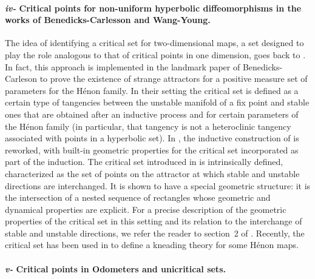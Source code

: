 \documentclass[a4paper,11pt]{article}
\theoremstyle{definition}
\begin{document}
\paragraph{{\em iv-} Critical points for non-uniform hyperbolic diffeomorphisms  in the  works of Benedicks-Carlesson and Wang-Young.}

The idea of identifying a critical set for two-dimensional maps, a set designed to play the role analogous to that of critical points in one dimension, goes back to \cite{BC}. In fact, this approach is implemented in the landmark paper of Benedicks-Carleson \cite{BC} to prove the existence of strange attractors for a positive measure set of parameters for the H\'enon family. In their setting the critical set is defined as a certain type of tangencies between the unstable manifold of a fix point and stable ones that are obtained after an inductive process and for certain parameters of the  H\'enon family (in particular, that tangency is  not a heteroclinic tangency associated with points in a hyperbolic set).
In \cite{WY}, the inductive construction of \cite{BC} is reworked, with built-in geometric properties for the critical set incorporated as part of the induction. 
The critical set introduced in \cite{WY} is intrinsically defined, characterized as the set of points on the attractor at which stable and unstable directions are interchanged. It is shown to have a special geometric structure: it is the intersection of a nested sequence of rectangles whose geometric and dynamical properties are explicit. For a precise description of the geometric properties of the critical set in 
this setting and its relation to the interchange of stable and unstable 
directions, we refer the reader to section~2 of \cite{WY}. 
Recently, the critical set has been used in \cite{BoS} to define a kneading theory for some H\'enon maps.



\paragraph{{\em v-} Critical points in Odometers and unicritical sets.}
\end{document}
